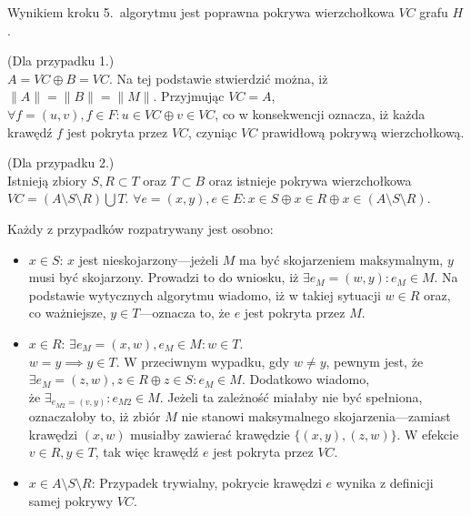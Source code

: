 \begin{theorem}\label{theorem_nf1}
  Wynikiem kroku 5.\ algorytmu jest poprawna pokrywa wierzchołkowa $VC$
  grafu $H$.
\end{theorem}
\begin{bproof}
  (Dla przypadku 1.) \\
  $A = VC \oplus B = VC$.
  Na tej podstawie stwierdzić można, iż ${\|A\|=\|B\|=\|M\|}$.
  Przyjmując $VC = A$, $\forall{f=(u,v), f\in F}: u \in VC \oplus v \in VC$, co
  w konsekwencji oznacza, iż każda krawędź $f$ jest pokryta przez $VC$, czyniąc
  $VC$ prawidłową pokrywą wierzchołkową.
\end{bproof}
\begin{bproof}
  (Dla przypadku 2.) \\
  Istnieją zbiory $S, R \subset T$ oraz $T \subset B$ oraz istnieje pokrywa 
  wierzchołkowa \\ $VC=(A \setminus S \setminus R) \bigcup T$.
  ${\forall{e=(x,y), e \in E}: x \in S \oplus x \in R \oplus x \in (A \setminus S
  \setminus R)}$.


  Każdy z przypadków rozpatrywany jest osobno:
  \begin{itemize}
    \item \underline{$x \in S$}: $x$ jest nieskojarzony---jeżeli $M$ ma być skojarzeniem 
      maksymalnym, $y$ musi być skojarzony.
      Prowadzi to do wniosku, iż $\exists{e_M=(w,y)}: e_M \in M$.
      Na podstawie wytycznych algorytmu wiadomo, iż w takiej sytuacji $w \in R$
      oraz, co ważniejsze, $y \in T$---oznacza to, że $e$ jest pokryta przez $M$.
    \item \underline{$x \in R$}: $\exists{e_M=(x,w), e_M\in M}: w \in T$. \\
      $w=y \implies y \in T$.
      W przeciwnym wypadku, gdy $w \neq y$, pewnym jest, że $\exists{e_M=(z,w),
      z \in R \oplus z \in S}: e_M \in M$.
      Dodatkowo wiadomo,\\że ${\exists_{e_{M2}=(v,y)}: e_{M2} \in M}$.
      Jeżeli ta zależność miałaby nie być spełniona, oznaczałoby to, iż zbiór $M$
      nie stanowi maksymalnego skojarzenia---zamiast krawędzi $(x,w)$ musiałby
      zawierać krawędzie $\{(x,y),(z,w)\}$.
      W efekcie $v \in R, y \in T$, tak więc krawędź $e$ jest pokryta przez $VC$.
    \item \underline{$x \in A \setminus S \setminus R$}: Przypadek trywialny,
      pokrycie krawędzi $e$ wynika z definicji samej pokrywy $VC$.
  \end{itemize}
\end{bproof}
